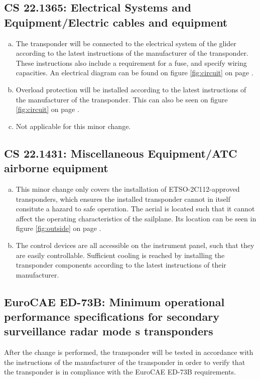 \documentclass{article}
\begin{document}
\subsection[CS 22.1365]{CS 22.1365:  Electrical Systems and Equipment/Electric cables and equipment}
\begin{enumerate}[(a)]
\item The transponder will be connected to the electrical system of the glider according to the latest instructions of the manufacturer of the transponder. These instructions also include a requirement for a fuse, and specify wiring capacities. An electrical diagram can be found on figure \ref{fig:circuit} on page \pageref{fig:circuit}.
\item Overload protection will be installed according to the latest instructions of the manufacturer of the transponder. This can also be seen on figure \ref{fig:circuit} on page \pageref{fig:circuit}.
\item Not applicable for this minor change.
\end{enumerate}

\subsection[CS 22.1431]{CS 22.1431:  Miscellaneous Equipment/ATC airborne equipment}
\begin{enumerate}[(a)]
\item This minor change only covers the installation of ETSO-2C112-approved transponders, which ensures the installed transponder cannot in itself consitute a hazard to safe operation. The aerial is located such that it cannot affect the operating characteristics of the sailplane. Its location can be seen in figure \ref{fig:outside} on page \pageref{fig:outside}.
\item The control devices are all accessible on the instrument panel, such that they are easily controllable. Sufficient cooling is reached by installing the transponder components according to the latest instructions of their manufacturer.
\end{enumerate}


\subsection[EuroCAE ED-73B]{EuroCAE ED-73B: Minimum operational performance specifications for secondary surveillance radar mode s transponders}
After the change is performed, the transponder will be tested in accordance with the instructions of the manufacturer of the transponder in order to verify that the transponder is in compliance with the EuroCAE ED-73B requirements.
\end{document}
